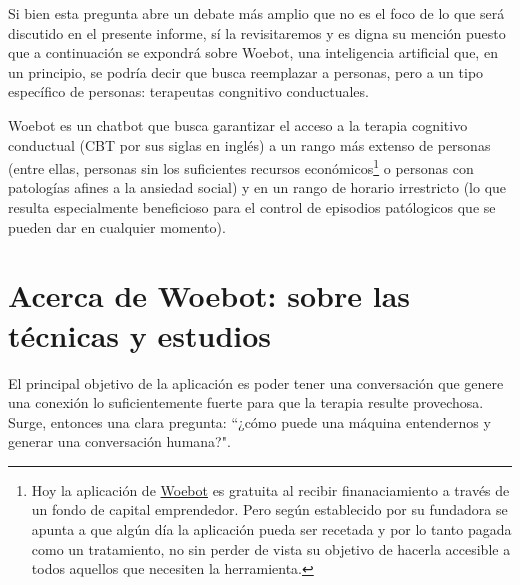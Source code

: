 \documentclass[11pt]{article}
\begin{document}
Si 
bien esta pregunta abre un debate más amplio que no es el foco
de lo 
que será discutido en el presente informe, sí la revisitaremos y es digna 
su
mención puesto que a continuación se expondrá sobre
Woebot, una inteligencia artificial que,
en un principio, se podría decir
que busca reemplazar
a personas, pero a un tipo específico de personas: 
terapeutas congnitivo conductuales. 



Woebot es un chatbot que busca garantizar el acceso a la terapia 
cognitivo conductual (CBT por sus siglas en inglés) a 
un rango más extenso de personas (entre ellas, personas 
sin los suficientes recursos económicos\footnotemark[1]\footnote[1]{Hoy la aplicación de \href{https://woebothealth.com/referral/}{Woebot} es gratuita 
al recibir finanaciamiento a través de un fondo de 
capital emprendedor. Pero según establecido por su 
fundadora se apunta a que algún día la aplicación 
pueda ser recetada y por lo tanto pagada como un 
tratamiento, no sin perder de vista su objetivo de 
hacerla accesible a todos aquellos que necesiten la 
herramienta.} o personas con 
patologías afines a la ansiedad social) y en un rango 
de horario irrestricto (lo que resulta especialmente 
beneficioso para el control de episodios patólogicos 
que se pueden dar en cualquier momento). 


\section{Acerca de Woebot: sobre las técnicas y estudios}
El principal objetivo de la aplicación es poder tener una conversación que genere una conexión
lo suficientemente fuerte para que la terapia resulte provechosa. Surge, entonces una clara 
pregunta: ``¿cómo puede una máquina entendernos y generar una conversación humana?".
\end{document}
